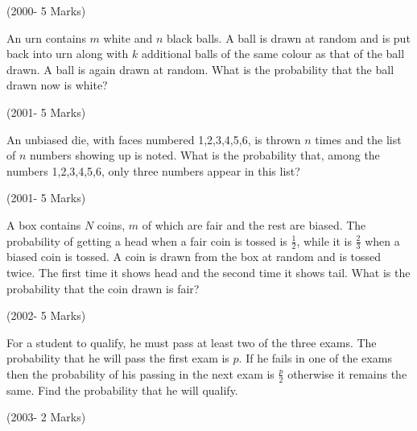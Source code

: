 \hfill(2000- 5 Marks)

\item An urn contains $m$ white and $n$ black balls. A ball is drawn at random and is put back into urn along with $k$ additional balls of the same colour as that of the ball drawn. A ball is again drawn at random. What is the probability that the ball drawn now is white?

\hfill(2001- 5 Marks)

\item An unbiased die, with faces numbered 1,2,3,4,5,6, is thrown $n$ times and the list of $n$ numbers showing up is noted. What is the probability that, among the numbers 1,2,3,4,5,6, only three numbers appear in this list?

\hfill(2001- 5 Marks)

\item A box contains $N$ coins, $m$ of which are fair and the rest are biased. The probability of getting a head when a fair coin is tossed is $\frac{1}{2}$, while it is $\frac{2}{3}$ when a biased coin is tossed. A coin is drawn from the box at random and is tossed twice. The first time it shows head and the second time it shows tail. What is the probability that the coin drawn is fair?

\hfill(2002- 5 Marks)

\item For a student to qualify, he must pass at least two of the three exams. The probability that he will pass the first exam is $p$. If he fails in one of the exams then the probability of his passing in the next exam is $\frac{p}{2}$ otherwise it remains the same. Find the probability that he will qualify.

\hfill(2003- 2 Marks)

